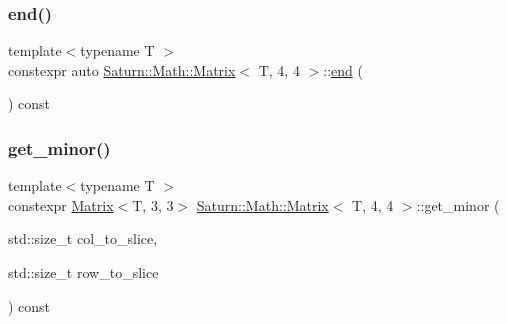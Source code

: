 \subsubsection{\texorpdfstring{end()}{end()}\hspace{0.1cm}{\footnotesize\ttfamily [2/2]}}
{\footnotesize\ttfamily template$<$typename T $>$ \\
constexpr auto \mbox{\hyperlink{class_saturn_1_1_math_1_1_matrix}{Saturn\+::\+Math\+::\+Matrix}}$<$ T, 4, 4 $>$\+::\mbox{\hyperlink{glad_8h_a432111147038972f06e049e18a837002}{end}} (\begin{DoxyParamCaption}{ }\end{DoxyParamCaption}) const\hspace{0.3cm}{\ttfamily [inline]}}

\mbox{\label{class_saturn_1_1_math_1_1_matrix_3_01_t_00_014_00_014_01_4_ade7a3b8f5601fd1cabd9833d4a15cab0}} 
\subsubsection{\texorpdfstring{get\+\_\+minor()}{get\_minor()}}
{\footnotesize\ttfamily template$<$typename T $>$ \\
constexpr \mbox{\hyperlink{class_saturn_1_1_math_1_1_matrix}{Matrix}}$<$T, 3, 3$>$ \mbox{\hyperlink{class_saturn_1_1_math_1_1_matrix}{Saturn\+::\+Math\+::\+Matrix}}$<$ T, 4, 4 $>$\+::get\+\_\+minor (\begin{DoxyParamCaption}\item[{std\+::size\+\_\+t}]{col\+\_\+to\+\_\+slice,  }\item[{std\+::size\+\_\+t}]{row\+\_\+to\+\_\+slice }\end{DoxyParamCaption}) const\hspace{0.3cm}{\ttfamily [inline]}}

\mbox{\label{class_saturn_1_1_math_1_1_matrix_3_01_t_00_014_00_014_01_4_a9cd002a975095ab960c1ab159e35498c}} 
